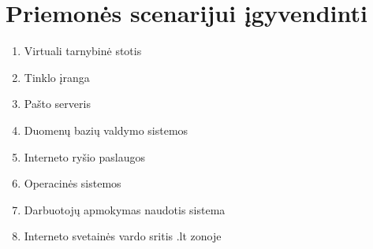 \section{Priemonės scenarijui įgyvendinti}
\begin{enumerate}
	\item Virtuali tarnybinė stotis
	\item Tinklo įranga
	\item Pašto serveris
	\item Duomenų bazių valdymo sistemos
	\item Interneto ryšio paslaugos
	\item Operacinės sistemos
	\item Darbuotojų apmokymas naudotis sistema
	\item Interneto svetainės vardo sritis .lt zonoje
\end{enumerate}